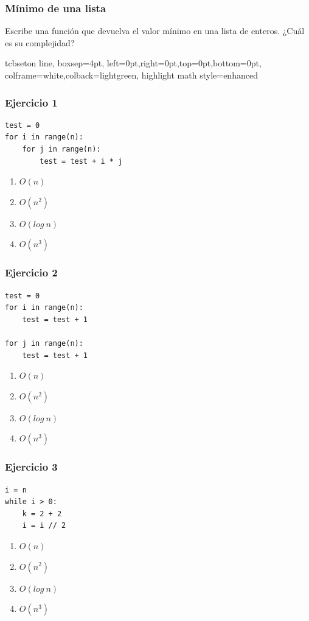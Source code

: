 \documentclass[11pt]{beamer}
\begin{document}
	\begin{frame}\frametitle{Mínimo de una lista}
	\begin{block}{}
	Escribe una función que devuelva el valor mínimo en una lista de enteros. ¿Cuál es su complejidad?
	\end{block}
	\end{frame}


	tcbset{on line, 
		boxsep=4pt, left=0pt,right=0pt,top=0pt,bottom=0pt,
		colframe=white,colback=lightgreen,  
		highlight math style={enhanced}
		}

	\begin{frame}[fragile]\frametitle{Ejercicio 1}
	\begin{lstlisting}
test = 0
for i in range(n):
	for j in range(n):
		test = test + i * j
\end{lstlisting}
	\begin{enumerate}
	\item $O(n)$
	\item $O(n^2)$
	\item $O(log\ n)$
	\item $O(n^3)$
	\end{enumerate}
	\end{frame}

	\begin{frame}[fragile]\frametitle{Ejercicio 2}
	\begin{lstlisting}
test = 0
for i in range(n):
	test = test + 1
	
for j in range(n):
	test = test + 1
\end{lstlisting}
	\begin{enumerate}
	\item $O(n)$
	\item $O(n^2)$
	\item $O(log\ n)$
	\item $O(n^3)$
	\end{enumerate}
	\end{frame}

	\begin{frame}[fragile]\frametitle{Ejercicio 3}
	\begin{lstlisting}
i = n
while i > 0:
	k = 2 + 2
	i = i // 2
\end{lstlisting}
	\begin{enumerate}
	\item $O(n)$
	\item $O(n^2)$
	\item $O(log\ n)$
	\item $O(n^3)$
	\end{enumerate}
	\end{frame}
\end{document}
